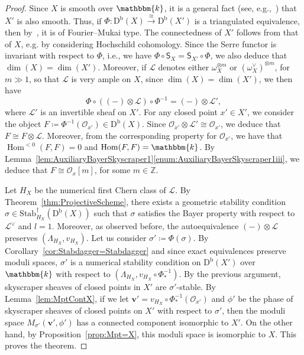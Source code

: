\documentclass[11pt, reqno]{amsart}
\numberwithin{equation}{section}
\theoremstyle{plain}
\theoremstyle{remark}
\theoremstyle{definition}
\theoremstyle{italicsname}
\newcommand{\bv}{\mathbf{v}}
\newcommand{\Db}{\mathrm{D^b}}
\newcommand{\Stabdagger}{\mathrm{Stab}^\dagger}
\DeclareMathOperator{\Hom}{Hom}
\newcommand{\cO}{\mathcal{O}}
\newcommand{\cL}{\mathcal{L}}
\newcommand{\KK}{\mathbbm{k}}
\def\ZZ{\ensuremath{\mathbb{Z}}}
\begin{document}
\begin{proof}
Since $X$ is smooth over $\KK$, it is a general fact (see, e.g.,~\cite[Lemma 4.9(6),(7)]{NCHPD}) that $X'$ is also smooth. 
Thus, if $\Phi\colon\Db(X)\xrightarrow{\cong}\Db(X')$ is a triangulated equivalence, then by~\cite{Orlov}, it is of Fourier--Mukai type.
The connectedness of $X'$ follows from that of $X$, e.g. by considering Hochschild cohomology.
Since the Serre functor is invariant with respect to $\Phi$, i.e., we have $\Phi\circ\mathsf{S}_X=\mathsf{S}_{X'}\circ\Phi$, we also deduce that $\dim(X)=\dim(X')$.
Moreover, if $\cL$ denotes either $\omega_X^{\otimes m}$ or $(\omega_X^\vee)^{\otimes m}$, for $m\gg1$, so that $\cL$ is very ample on $X$, since $\dim(X)=\dim(X')$, we then have
\[
\Phi\circ((-)\otimes\cL)\circ\Phi^{-1}=(-)\otimes\cL',
\]
where $\cL'$ is an invertible sheaf on $X'$.
For any closed point $x'\in X'$, we consider the object $F\coloneqq\Phi^{-1}(\cO_{x'})\in\Db(X)$.
Since $\cO_{x'}\otimes\cL'\cong\cO_{x'}$, we deduce that $F\cong F\otimes\cL$.
Moreover, from the corresponding property for $\cO_{x'}$, we have that $\Hom^{<0}(F,F)=0$ and $\Hom(F,F)=\KK$.
By Lemma~\ref{lem:AuxiliaryBayerSkyscraper1}\ref{enum:AuxiliaryBayerSkyscraper1iii}, we deduce that $F\cong\cO_x[m]$, for some $m\in\ZZ$.

Let $H_X$ be the numerical first Chern class of $\cL$. 
By Theorem~\ref{thm:ProjectiveScheme}, there exists a geometric stability condition $\sigma\in\Stabdagger_{H_X}(\Db(X))$ such that $\sigma$ satisfies the Bayer property with respect to $\cL^\vee$ and $l=1$.
Moreover, as observed before, the autoequivalence $(-)\otimes\cL$ preserves $(\Lambda_{H_X},v_{H_X})$. 
Let us consider $\sigma' \coloneqq \Phi(\sigma)$.
By Corollary~\ref{cor:Stabdagger=Stabdagger} and since exact equivalences preserve moduli spaces, $\sigma'$ is a numerical stability condition on $\Db(X')$ over $\KK$ with respect to $(\Lambda_{H_X},v_{H_X}\circ\Phi^{-1}_*)$.
By the previous argument, skyscraper sheaves of closed points in $X'$ are $\sigma'$-stable.
By Lemma~\ref{lem:MptContX}, if we let $\bv'=v_{H_X} \circ\Phi^{-1}_*(\cO_{x'})$ and $\phi'$ be the phase of skyscraper sheaves of closed points on $X'$ with respect to $\sigma'$, then the moduli space $M_{\sigma'}(\bv',\phi')$ has a connected component isomorphic to $X'$. 
On the other hand, by Proposition~\ref{prop:Mpt=X}, this moduli space is isomorphic to $X$. 
This proves the theorem. 
\end{proof}
\end{document}
